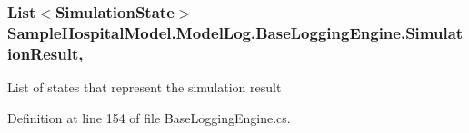 \subsubsection[{\texorpdfstring{Simulation\+Result}{SimulationResult}}]{\setlength{\rightskip}{0pt plus 5cm}List$<${\bf Simulation\+State}$>$ Sample\+Hospital\+Model.\+Model\+Log.\+Base\+Logging\+Engine.\+Simulation\+Result\hspace{0.3cm}{\ttfamily [get]}, {\ttfamily [set]}}\hypertarget{class_sample_hospital_model_1_1_model_log_1_1_base_logging_engine_ad9b6b545975b8e9ac4d223b30971b0f1}{}\label{class_sample_hospital_model_1_1_model_log_1_1_base_logging_engine_ad9b6b545975b8e9ac4d223b30971b0f1}


List of states that represent the simulation result 



Definition at line 154 of file Base\+Logging\+Engine.\+cs.

